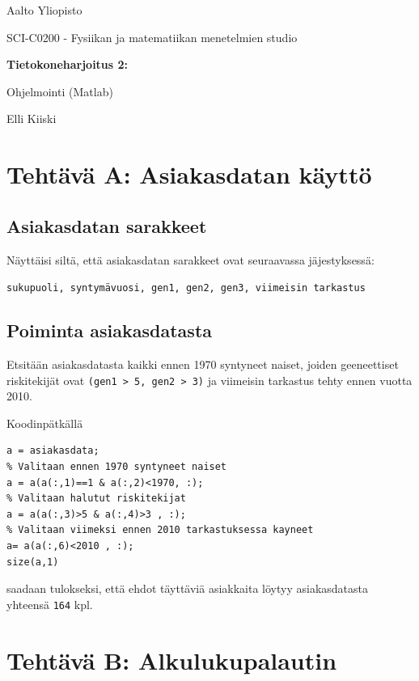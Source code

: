 \documentclass[a4paper,11pt]{article}
\begin{document}
{
\thispagestyle{empty}

{\large
Aalto Yliopisto
\par
SCI-C0200 - Fysiikan ja matematiikan menetelmien studio
}

\vspace{7cm}

{\huge \bf
Tietokoneharjoitus 2: 
\par
Ohjelmointi (Matlab)}

\vspace{2cm}

{\Large Elli Kiiski}

\clearpage

\tableofcontents

\clearpage

\section{Tehtävä A: Asiakasdatan käyttö} 		  

\subsection{Asiakasdatan sarakkeet}

Näyttäisi siltä, että asiakasdatan sarakkeet ovat seuraavassa jäjestyksessä:

\texttt{sukupuoli, syntymävuosi, gen1, gen2, gen3, viimeisin tarkastus}

\subsection{Poiminta asiakasdatasta}

Etsitään asiakasdatasta kaikki ennen 1970 syntyneet naiset, joiden geeneettiset riskitekijät ovat \texttt{(gen1 > 5, gen2 > 3)} ja viimeisin tarkastus tehty ennen vuotta 2010.

Koodinpätkällä

\begin{lstlisting}
a = asiakasdata;
% Valitaan ennen 1970 syntyneet naiset
a = a(a(:,1)==1 & a(:,2)<1970, :);
% Valitaan halutut riskitekijat
a = a(a(:,3)>5 & a(:,4)>3 , :);
% Valitaan viimeksi ennen 2010 tarkastuksessa kayneet
a= a(a(:,6)<2010 , :);
size(a,1)
\end{lstlisting}

saadaan tulokseksi, että ehdot täyttäviä asiakkaita löytyy asiakasdatasta yhteensä \texttt{164} kpl.

\section{Tehtävä B: Alkulukupalautin}

}
\end{document}
